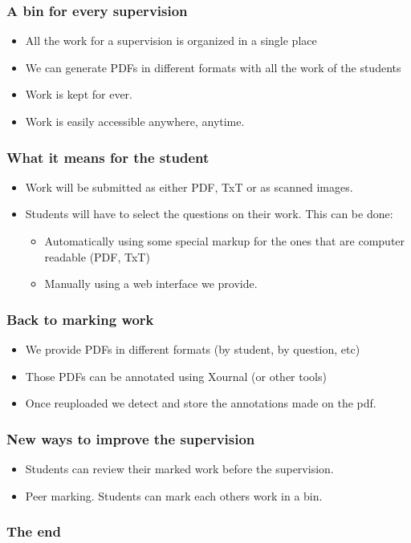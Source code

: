 \documentclass{beamer}
\begin{document}
  	\begin{frame}
    	\frametitle{A bin for every supervision}
    	\begin{itemize}
    		\item All the work for a supervision is organized in a single place
    	    \item We can generate PDFs in different formats with all the work of the students  
    		\item Work is kept for ever. 
    		\item Work is easily accessible anywhere, anytime.
    	\end{itemize}
    \end{frame}
    \begin{frame}
    	\frametitle{What it means for the student}
    	\begin{itemize}
    		\item Work will be submitted as either PDF, TxT or as scanned images.
    		\item Students will have to select the questions on their work. This can be done:
    		\begin{itemize}
    			\item Automatically using some special markup for the ones that are computer readable (PDF, TxT)
    			\item Manually using a web interface we provide.    			\end{itemize}
    	\end{itemize}    	
    \end{frame}
    
    \begin{frame}
    	\frametitle{Back to marking work}
    	\begin{itemize}
    		\item We provide PDFs in different formats (by student, by question, etc)
    		\item Those PDFs can be annotated using Xournal (or other tools)
    		\item Once reuploaded we detect and store the annotations made on the pdf.
    	\end{itemize}
    \end{frame}
    
    \begin{frame}
    	\frametitle{New ways to improve the supervision}
    	\begin{itemize}
    		\item Students can review their marked work before the supervision.
    		\item Peer marking. Students can mark each others work in a bin.
    		
 
    	\end{itemize}
    \end{frame}
    \begin{frame}
    	\frametitle{The end}
    \end{frame}
\end{document}
